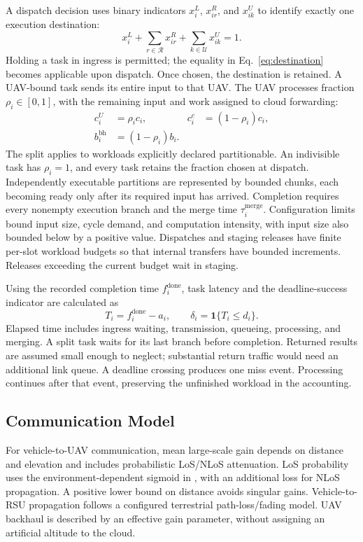\documentclass[journal]{IEEEtran}
\begin{document}
A dispatch decision uses binary indicators $x_i^L$, $x_{ir}^R$, and $x_{ik}^U$ to identify exactly one execution destination:
\begin{equation}
x_i^L+\sum_{r\in\mathcal R}x_{ir}^R
       +\sum_{k\in\mathcal U}x_{ik}^U=1.
\label{eq:destination}
\end{equation}
Holding a task in ingress is permitted; the equality in Eq.~\eqref{eq:destination} becomes applicable upon dispatch. Once chosen, the destination is retained. A UAV-bound task sends its entire input to that UAV. The UAV processes fraction $\rho_i\in[0,1]$, with the remaining input and work assigned to cloud forwarding:
\begin{equation}
\begin{aligned}
c_i^{U}&=\rho_i c_i,& c_i^{c}&=(1-\rho_i)c_i,\\
b_i^{\mathrm{bh}}&=(1-\rho_i)b_i.
\end{aligned}
\label{eq:split}
\end{equation}
The split applies to workloads explicitly declared partitionable. An indivisible task has $\rho_i=1$, and every task retains the fraction chosen at dispatch. Independently executable partitions are represented by bounded chunks, each becoming ready only after its required input has arrived. Completion requires every nonempty execution branch and the merge time $\tau_i^{\mathrm{merge}}$. Configuration limits bound input size, cycle demand, and computation intensity, with input size also bounded below by a positive value. Dispatches and staging releases have finite per-slot workload budgets so that internal transfers have bounded increments. Releases exceeding the current budget wait in staging.

Using the recorded completion time $f_i^{\mathrm{done}}$, task latency and the deadline-success indicator are calculated as
\begin{equation}
T_i=f_i^{\mathrm{done}}-a_i,\qquad
\delta_i=\mathbf 1\{T_i\le d_i\}.
\label{eq:actual_latency}
\end{equation}
Elapsed time includes ingress waiting, transmission, queueing, processing, and merging. A split task waits for its last branch before completion. Returned results are assumed small enough to neglect; substantial return traffic would need an additional link queue. A deadline crossing produces one miss event. Processing continues after that event, preserving the unfinished workload in the accounting.

\subsection{Communication Model}
For vehicle-to-UAV communication, mean large-scale gain depends on distance and elevation and includes probabilistic LoS/NLoS attenuation. LoS probability uses the environment-dependent sigmoid in \cite{yan2026rmaddpg}, with an additional loss for NLoS propagation. A positive lower bound on distance avoids singular gains. Vehicle-to-RSU propagation follows a configured terrestrial path-loss/fading model. UAV backhaul is described by an effective gain parameter, without assigning an artificial altitude to the cloud.
\end{document}
